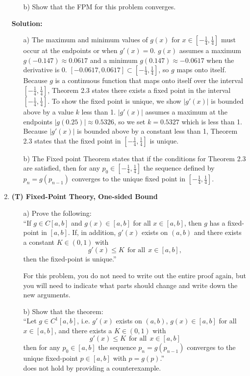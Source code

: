 \documentclass[10pt]{article}
\begin{document}
\begin{enumerate}[label=\bfseries Problem \arabic*:]
\begin{itemize}
\item[b)]  Show that the FPM for this problem converges. 
\end{itemize}
\vspace{1em}
\textbf{Solution:}\par 
\begin{itemize} 
    \item[a)]  The maximum and minimum values of $g(x)$ for $x\in[-\frac{1}{4},\frac{1}{4}]$ must occur at the endpoints or when $g'(x)=0$.
    $g(x)$ assumes a maximum $g(-0.147)\approx0.0617$ and a minimum $g(0.147)\approx-0.0617$ when the derivative is 0.
    $[-0.0617,0.0617]\subset[-\frac{1}{4},\frac{1}{4}]$, so $g$ maps onto itself.
    Because $g$ is a continuous function that maps onto itself over the interval $[-\frac{1}{4},\frac{1}{4}]$, Theorem 2.3 states there exists a fixed point in the interval $[-\frac{1}{4},\frac{1}{4}]$.
    To show the fixed point is unique, we show $|g'(x)|$ is bounded above by a value $k$ less than 1.
    $|g'(x)|$ assumes a maximum at the endpoints $|g(0.25)|\approx0.5326$, so we set $k=0.5327$ which is less than 1.
    Because $|g'(x)|$ is bounded above by a constant less than 1, Theorem 2.3 states that the fixed point in $[-\frac{1}{4},\frac{1}{4}]$ is unique.
    \item[b)] The Fixed point Theorem states that if the conditions for Theorem 2.3 are satisfied, then for any $p_0\in[-\frac{1}{4},\frac{1}{4}]$ the sequence defined by $p_n=g(p_{n-1})$ converges to the unique fixed point in $[-\frac{1}{4},\frac{1}{4}]$.
\end{itemize}   
\newpage
\item \textbf{(T) Fixed-Point Theory, One-sided Bound}
\begin{itemize} 
\item[a)] Prove the following: \\
``If $g \in C[a,b]$ and $g(x) \in [a,b]$ for all $x\in[a,b]$, then $g$ has a fixed-point in $[a,b]$. If, in addition, $g'(x)$ exists on $(a,b)$ and there exists a constant $K \in (0,1)$ with 
    $$g'(x) \leq K \ \ \text{for all} \ \  x\in[a,b],$$
    then the fixed-point is unique.''

For this problem, you do not need to write out the entire proof again, but you will need to indicate what parts should change and write down the new arguments.

\item[b)] Show that the theorem: \\
``Let $g \in C^1[a,b]$, i.e. $g'(x)$ exists on $(a,b)$, $g(x) \in [a,b]$ for all $x\in[a,b]$,  and there exists a $K \in (0,1)$ with 
    $$g'(x) \leq K \ \ \text{for all} \ \  x\in[a,b]$$
    then for any $p_0 \in [a,b]$ the sequence $p_n=g(p_{n-1})$ converges to the unique fixed-point $p\in [a,b]$ with $p=g(p)$.''\\
    does not hold by providing a counterexample. 


\end{itemize}
\end{enumerate}
\end{document}
